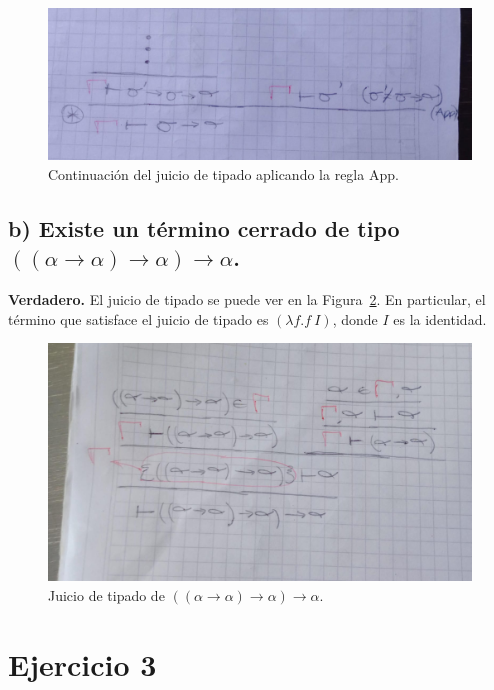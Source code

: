 \documentclass{article}
\begin{document}
\begin{figure}[htbp]
    \centering
\includegraphics[scale=0.2]{ej2a3.jpeg}
\caption{Continuación del juicio de tipado aplicando la regla App.}
\label{fig:ej2a3}
\end{figure}

\subsection*{b) Existe un término cerrado de tipo $((\alpha \rightarrow \alpha) \rightarrow \alpha) \rightarrow \alpha$.}

\textbf{Verdadero.} El juicio de tipado se puede ver en la Figura~\ref{fig:ej2b}. En particular, el término que satisface el juicio de tipado es $(\lambda f. f\ I)$, donde $I$ es la identidad.

\begin{figure}[htbp]
    \centering
\includegraphics[scale=0.2]{ej2b.jpeg}
\caption{Juicio de tipado de $((\alpha \rightarrow \alpha) \rightarrow \alpha) \rightarrow \alpha$.}
\label{fig:ej2b}
\end{figure}

\section*{Ejercicio 3}
\end{document}
